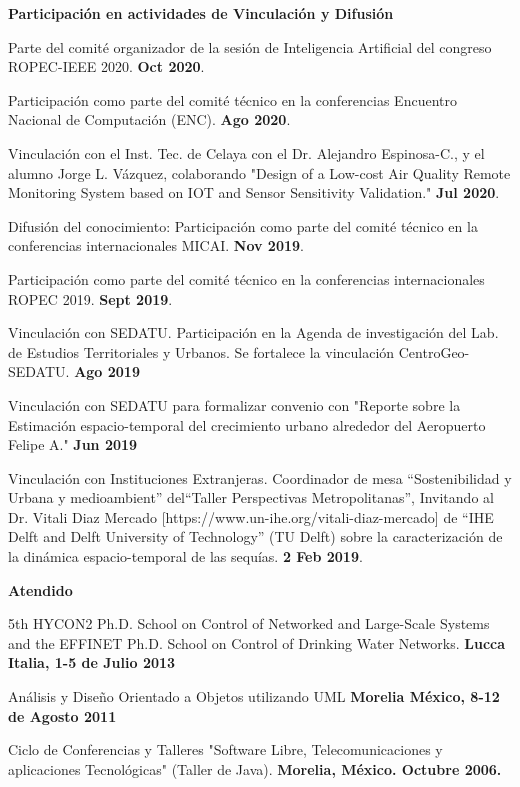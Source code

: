 \documentclass[10pt]{article}
\newenvironment{innerlist}[1][\enskip\textbullet]%
        {\begin{compactitem}[#1]}{\end{compactitem}}
\newcommand{\blankline}{\quad\pagebreak[2]}
\begin{document}
\textbf{Participación en actividades de Vinculación y Difusión}
\begin{innerlist}
\item Parte del comité organizador de la sesión de Inteligencia Artificial del congreso ROPEC-IEEE 2020. \textbf{Oct 2020}.
\item Participación como parte del comité técnico en la conferencias Encuentro Nacional de Computación (ENC). \textbf{Ago 2020}.
\item Vinculación con el Inst. Tec. de Celaya con el Dr. Alejandro Espinosa-C., y el alumno  Jorge L. Vázquez, colaborando "Design of a Low-cost Air Quality Remote Monitoring System based on IOT and Sensor Sensitivity Validation." \textbf{Jul 2020}.
\item Difusión del conocimiento: Participación como parte del comité técnico en la conferencias internacionales MICAI. \textbf{Nov 2019}.
\item Participación como parte del comité técnico en la conferencias internacionales ROPEC 2019. \textbf{Sept 2019}.
\item Vinculación con SEDATU. Participación en la Agenda de investigación del Lab. de Estudios Territoriales y Urbanos. Se fortalece la vinculación CentroGeo-SEDATU. \textbf{Ago 2019}
\item Vinculación con SEDATU para formalizar convenio con "Reporte sobre la Estimación espacio-temporal del crecimiento urbano alrededor del Aeropuerto Felipe A." \textbf{Jun 2019}
\item Vinculación con Instituciones Extranjeras. Coordinador de mesa ``Sostenibilidad y Urbana y medioambient'' del``Taller Perspectivas Metropolitanas'', Invitando al Dr. Vitali Diaz Mercado  [https://www.un-ihe.org/vitali-diaz-mercado] de ``IHE Delft and Delft University of Technology'' (TU Delft) sobre la caracterización de la dinámica espacio-temporal de las sequías. \textbf{2 Feb 2019}.
\end{innerlist}


\blankline

\textbf{Atendido}
\begin{innerlist}
\item 5th HYCON2 Ph.D. School on Control of Networked and Large-Scale Systems and the EFFINET Ph.D. School on Control of Drinking Water Networks. \textbf{Lucca Italia, 1-5 de Julio 2013}

\item Análisis y Diseño Orientado a Objetos utilizando  UML  \textbf{Morelia México,  8-12 de Agosto 2011}

\item Ciclo de Conferencias y Talleres "Software Libre, Telecomunicaciones y aplicaciones Tecnológicas" (Taller de Java). \textbf{Morelia, México. Octubre 2006.}

\end{innerlist}
\end{document}
